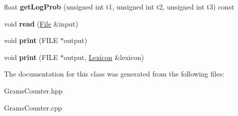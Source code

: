 \begin{DoxyCompactItemize}
float {\bfseries get\+Log\+Prob} (unsigned int t1, unsigned int t2, unsigned int t3) const
\item 
\mbox{\label{classGramsCounter_a8019ed3baf4bbf6d432177ba971095fc}} 
void {\bfseries read} (\hyperlink{classFile}{File} \&input)
\item 
\mbox{\label{classGramsCounter_a05ccff4ad467e1200e2e202e572bb2ca}} 
void {\bfseries print} (F\+I\+LE $\ast$output)
\item 
\mbox{\label{classGramsCounter_a1c70211f6f1c5a81bd1711f6909d914b}} 
void {\bfseries print} (F\+I\+LE $\ast$output, \hyperlink{classLexicon}{Lexicon} \&lexicon)
\end{DoxyCompactItemize}


The documentation for this class was generated from the following files\+:\begin{DoxyCompactItemize}
\item 
Grams\+Counter.\+hpp\item 
Grams\+Counter.\+cpp\end{DoxyCompactItemize}
